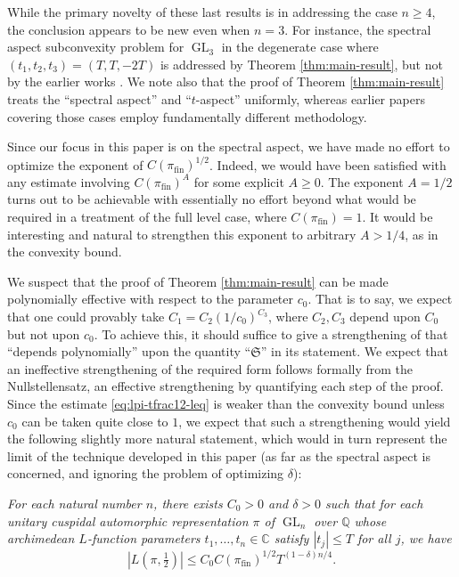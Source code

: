 \documentclass[reqno]{amsart}
\DeclareMathOperator{\GL}{GL}
\DeclareMathOperator{\fin}{fin}
\theoremstyle{plain} \newtheorem{theorem} {Theorem}
\theoremstyle{definition} \newtheorem{definition} [theorem] {Definition}
\theoremstyle{itplain} %
\numberwithin{equation}{section}
\numberwithin{theorem}{section}
\renewcommand{\geq}{\geqslant}
\renewcommand{\leq}{\leqslant}
\begin{document}
\begin{remark}
    While the primary novelty of these last results is in addressing the case $n \geq 4$, the conclusion appears to be new even when $n=3$.  For instance, the spectral aspect subconvexity problem for $\GL_3$ in the degenerate case where $(t_1,t_2,t_3) = (T, T, - 2 T)$ is addressed by Theorem \ref{thm:main-result}, but not by the earlier works \cite{MR4203038, MR4039487, 2020arXiv200607819K}.  We note also that the proof of Theorem \ref{thm:main-result} treats the ``spectral aspect'' and ``$t$-aspect'' uniformly, whereas earlier papers covering those cases \cite{MR3369905, MR4270876, MR4203038, MR4039487, 2020arXiv200607819K} employ fundamentally different methodology.
  \end{remark}
  
\begin{remark}
  Since our focus in this paper is on the spectral aspect, we have made no effort to optimize the exponent of $C(\pi_{\fin})^{1/2}$.  Indeed, we would have been satisfied with any estimate involving $C(\pi_{\fin})^A$ for some explicit $A \geq 0$.  The exponent $A = 1/2$ turns out to be achievable with essentially no effort beyond what would be required in a treatment of the full level case, where $C(\pi_{\fin}) = 1$.  It would be interesting and natural to strengthen this exponent to arbitrary $A > 1/4$, as in the convexity bound.
\end{remark}

\begin{remark}
  We suspect that the proof of Theorem \ref{thm:main-result} can be made polynomially effective with respect to the parameter $c_0$.  That is to say, we expect that one could provably take $C_1 = C_2 (1/c_0)^{C_3}$, where $C_2, C_3$ depend upon $C_0$ but not upon $c_0$.  To achieve this, it should suffice to give a strengthening of \cite[Theorem 15.2]{2020arXiv201202187N} that ``depends polynomially'' upon the quantity ``$\mathfrak{S}$'' in its statement.  We expect that an ineffective strengthening of the required form follows formally from the Nullstellensatz, an effective strengthening by quantifying each step of the proof.  Since the estimate \eqref{eq:lpi-tfrac12-leq} is weaker than the convexity bound unless $c_0$ can be taken quite close to $1$, we expect that such a strengthening would yield the following slightly more natural statement, which would in turn represent the limit of the technique developed in this paper (as far as the spectral aspect is concerned, and ignoring the problem of optimizing $\delta$):

  \emph{  For each natural number $n$, there exists $C_0 > 0$ and $\delta > 0$ such that for each unitary cuspidal automorphic representation $\pi$ of $\GL_n$ over $\mathbb{Q}$ whose archimedean $L$-function parameters $t_1,\dotsc,t_n \in \mathbb{C}$ satisfy $|t_j| \leq T$ for all $j$, we have}
  \begin{equation*}
    |L(\pi, \tfrac{1}{2})| \leq C_0 C(\pi_{\fin})^{1/2} T^{(1-\delta)n/4}.
  \end{equation*}
\end{remark}
\end{document}
